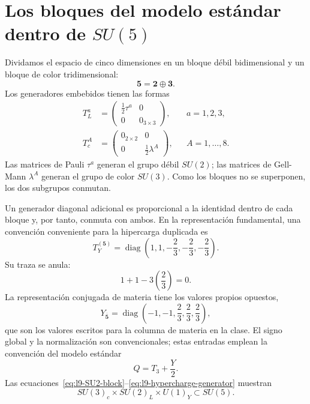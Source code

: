 \section{Los bloques del modelo estándar dentro de \texorpdfstring{\(SU(5)\)}{SU(5)}}

Dividamos el espacio de cinco dimensiones en un bloque débil bidimensional y un bloque de color tridimensional:
\begin{equation}
\mathbf5=\mathbf2\oplus\mathbf3.
\end{equation}
Los generadores embebidos tienen las formas
\begin{align}
T^a_L
&=
\begin{pmatrix}
\tfrac12\tau^a&0\\
0&0_{3\times3}
\end{pmatrix},
&& a=1,2,3,
\label{eq:l9-SU2-block}\\
T^A_c
&=
\begin{pmatrix}
0_{2\times2}&0\\
0&\tfrac12\lambda^A
\end{pmatrix},
&& A=1,\ldots,8.
\label{eq:l9-SU3-block}
\end{align}
Las matrices de Pauli \(\tau^a\) generan el grupo débil \(SU(2)\); las matrices de Gell-Mann \(\lambda^A\) generan el grupo de color \(SU(3)\). Como los bloques no se superponen, los dos subgrupos conmutan.

Un generador diagonal adicional es proporcional a la identidad dentro de cada bloque y, por tanto, conmuta con ambos. En la representación fundamental, una convención conveniente para la hipercarga duplicada es
\begin{equation}
T_Y^{(\mathbf5)}=
\operatorname{diag}
\left(
1,1,-\frac23,-\frac23,-\frac23
\right).
\label{eq:l9-hypercharge-generator}
\end{equation}
Su traza se anula:
\begin{equation}
1+1-3\left(\frac23\right)=0.
\end{equation}
La representación conjugada de materia tiene los valores propios opuestos,
\begin{equation}
Y_{\overline{\mathbf5}}
=
\operatorname{diag}
\left(
-1,-1,\frac23,\frac23,\frac23
\right),
\label{eq:l9-fivebar-hypercharge}
\end{equation}
que son los valores escritos para la columna de materia en la clase. El signo global y la normalización son convencionales; estas entradas emplean la convención del modelo estándar
\begin{equation}
Q=T_3+\frac{Y}{2}.
\label{eq:l9-charge}
\end{equation}
Las ecuaciones~\eqref{eq:l9-SU2-block}--\eqref{eq:l9-hypercharge-generator} muestran
\begin{equation}
SU(3)_c\times SU(2)_L\times U(1)_Y
\subset SU(5).
\end{equation}

